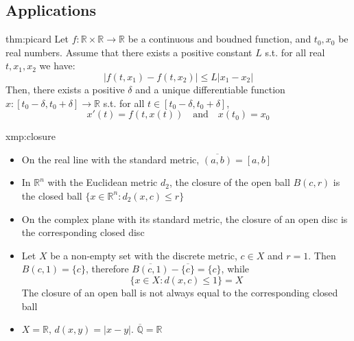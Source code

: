 \documentclass[landscape, 8pt]{extarticle}
\begin{document}
\begin{multicols}{3}
\section{Applications}




\begin{thm}{thm:picard}{}
    Let $f : \mathbb{R} \times \mathbb{R} \to \mathbb{R}$ be a continuous and boudned function, and $t_{0}, x_{0}$ be real numbers. Assume that there exists a positive constant $L$ s.t. for all real $t, x_{1}, x_{2}$ we have:
    \[\lvert f(t, x_{1}) - f(t, x_{2}) \rvert \le L\lvert x_{1} - x_{2} \rvert\]
    Then, there exists a positive $\delta$ and a unique differentiable function $x : [t_{0} - \delta, t_{0} + \delta]\to \mathbb{R}$ s.t. for all $t\in [t_{0}-\delta, t_{0} + \delta]$,
    \[x'(t) = f(t, x(t)) \quad \text{and} \quad x(t_{0}) = x_{0}\]
\end{thm}


\begin{xmp}{xmp:closure}{}
    \begin{itemize}[leftmargin=*]
        \item On the real line with the standard metric, $\overline{(a,b)} = [a,b]$
        \item In $\mathbb{R}^{n}$ with the Euclidean metric $d_{2}$, the closure of the open ball $B(c,r)$ is the closed ball $\{x\in\mathbb{R}^{n}: d_{2}(x,c)\le r\}$
        \item On the complex plane with its standard metric, the closure of an open disc is the corresponding closed disc
        \item Let $X$ be a non-empty set with the discrete metric, $c\in X$ and $r =1$. Then $B(c,1) = \{c\}$, therefore $\overline{B(c,1)} - \overline{\{c\}} = \{c\}$, while
            \[\{x\in X : d(x,c) \le 1\} = X\]
            The closure of an open ball is not always equal to the corresponding closed ball
        \item $X = \mathbb{R},\,d(x,y) = \lvert x - y \rvert$. $\overline{\mathbb{Q}} = \mathbb{R}$
    \end{itemize}
\end{xmp}



\vspace{1000em}
\end{multicols}
\end{document}
